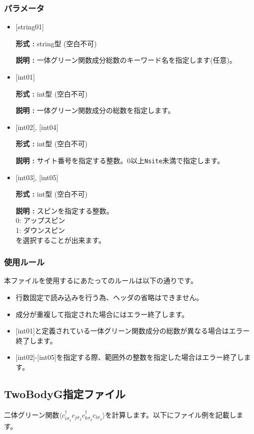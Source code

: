 \subsubsection{パラメータ}
 \begin{itemize}

   \item  $[$string01$]$
   
    {\bf 形式 :} string型 (空白不可)

   {\bf 説明 :} 一体グリーン関数成分総数のキーワード名を指定します(任意)。

   \item  $[$int01$]$
   
    {\bf 形式 :} int型 (空白不可)

   {\bf 説明 :} 一体グリーン関数成分の総数を指定します。

  \item  $[$int02$]$, $[$int04$]$

 {\bf 形式 :} int型 (空白不可)

{\bf 説明 :} サイト番号を指定する整数。0以上\verb|Nsite|{未満}で指定します。
 
  \item  $[$int03$]$, $[$int05$]$

 {\bf 形式 :} int型 (空白不可)

{\bf 説明 :} スピンを指定する整数。\\
0: アップスピン\\
1: ダウンスピン\\
を選択することが出来ます。

\end{itemize}

\subsubsection{使用ルール}
本ファイルを使用するにあたってのルールは以下の通りです。
\begin{itemize}
\item 行数固定で読み込みを行う為、ヘッダの省略はできません。
\item 成分が重複して指定された場合にはエラー終了します。
\item $[$int01$]$と定義されている一体グリーン関数成分の総数が異なる場合はエラー終了します。
\item $[$int02$]$-$[$int05$]$を指定する際、範囲外の整数を指定した場合はエラー終了します。
\end{itemize}

\newpage
\subsection{TwoBodyG指定ファイル}
\label{Subsec:twobodyg}
二体グリーン関数$\langle c_{i\sigma_1}^{\dagger}c_{j\sigma_2}c_{k\sigma_3}^{\dagger}c_{l\sigma_4}\rangle$を計算します。以下にファイル例を記載します。

